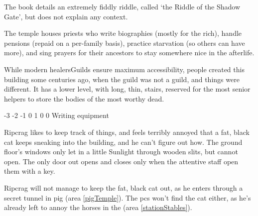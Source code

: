\begin{multicols}{2}
\townmaster

The book details an extremely fiddly riddle, called `the Riddle of the Shadow Gate', but does not explain any context.


\hardestRiddleEver


The temple houses priests who write biographies (mostly for the rich), handle pensions (repaid on a per-family basis), practice starvation (so others can have more), and sing prayers for their ancestors to stay somewhere nice in the afterlife.

While modern \glspl{healersGuild} ensure maximum accessibility, people created this building some centuries ago, when the guild was not a guild, and things were different.
It has a lower level, with long, thin, stairs, reserved for the most senior \glspl{helper} to store the bodies of the most worthy dead.

{-3}%
{-2}%
{{-1}%
{0}%
{1}}%
{0}%
{0}%
{}%
{Writing equipment}%
{
  \setcounter{Academics}{1}
  \setcounter{Empathy}{2}
  \setcounter{Medicine}{2}
  \addtocounter{fp}{5}
}


Ripcrag likes to keep track of things, and feels terribly annoyed that a fat, black cat keeps sneaking into the building, and he can't figure out how.
The ground floor's windows only let in a little Sunlight through wooden slits, but cannot open.
The only door out opens and closes only when the attentive staff open them with a key.

Ripcrag will not manage to keep the fat, black cat out, as he enters through a secret tunnel in \gls{pig} (area \vref{pigTemple}).
The \glspl{pc} won't find the cat either, as he's already left to annoy the horses in the  (area \vref{stationStables}).



\end{multicols}
